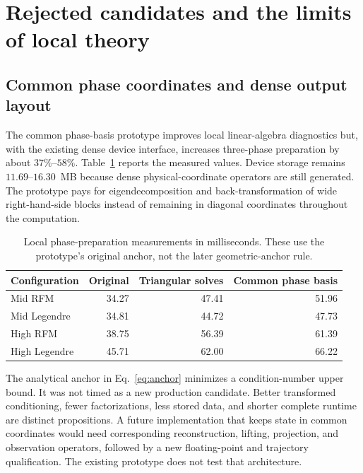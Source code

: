 

\section{Rejected candidates and the limits of local theory}
\label{sec:negative-results}

\subsection{Common phase coordinates and dense output layout}

The common phase-basis prototype improves local linear-algebra diagnostics but, with the existing dense device interface, increases three-phase preparation by about $37\%$--$58\%$. Table~\ref{tab:phase-setup} reports the measured values. Device storage remains $11.69$--$16.30$~MB because dense physical-coordinate operators are still generated. The prototype pays for eigendecomposition and back-transformation of wide right-hand-side blocks instead of remaining in diagonal coordinates throughout the computation.

\begin{table}[tbp]
\centering\small
\caption{Local phase-preparation measurements in milliseconds. These use the prototype's original anchor, not the later geometric-anchor rule.}
\label{tab:phase-setup}
\begin{tabularx}{\linewidth}{@{}Xrrr@{}}
\toprule
Configuration & Original & Triangular solves & Common phase basis \\
\midrule
Mid RFM & 34.27 & 47.41 & 51.96 \\
Mid Legendre & 34.81 & 44.72 & 47.73 \\
High RFM & 38.75 & 56.39 & 61.39 \\
High Legendre & 45.71 & 62.00 & 66.22 \\
\bottomrule
\end{tabularx}
\end{table}

The analytical anchor in Eq.~\eqref{eq:anchor} minimizes a condition-number upper bound. It was not timed as a new production candidate. Better transformed conditioning, fewer factorizations, less stored data, and shorter complete runtime are distinct propositions. A future implementation that keeps state in common coordinates would need corresponding reconstruction, lifting, projection, and observation operators, followed by a new floating-point and trajectory qualification. The existing prototype does not test that architecture.

